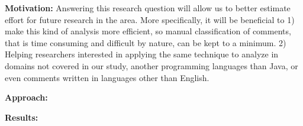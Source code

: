 
\vspace{3mm}
\noindent\rqiii
\vspace{3mm}

\noindent \textbf{Motivation:} Answering this research question will allow us to better estimate effort for future research in the area. More specifically, it will be beneficial to 1) make this kind of analysis more efficient, so manual classification of comments, that is time consuming and difficult by nature, can be kept to a minimum. 2) Helping researchers interested in applying the same technique to analyze \SATD in domains not covered in our study, another programming languages than Java, or even comments written in languages other than English. 

\vspace{1mm}
\noindent \textbf{Approach:} 

\vspace{1mm}
\noindent \textbf{Results:} 

\conclusionbox{}